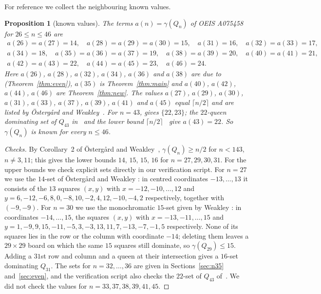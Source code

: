 \documentclass[11pt]{article}
\newtheorem{proposition}[theorem]{Proposition}
\theoremstyle{definition}
\theoremstyle{remark}
\begin{document}
For reference we collect the neighbouring known values.

\begin{proposition}[known values]\label{cor:oeis}
The terms $a(n)=\gamma(Q_n)$ of OEIS A075458 for $26\le n\le46$ are
\begin{gather*}
  a(26)=a(27)=14,\quad a(28)=a(29)=a(30)=15,\quad a(31)=16,\quad a(32)=a(33)=17,\\
  a(34)=18,\quad a(35)=a(36)=a(37)=19,\quad a(38)=a(39)=20,\quad a(40)=a(41)=21,\\
  a(42)=a(43)=22,\quad a(44)=a(45)=23,\quad a(46)=24 .
\end{gather*}
Here $a(26)$, $a(28)$, $a(32)$, $a(34)$, $a(36)$ and $a(38)$ are due to~\cite{HC} (Theorem~\ref{thm:even}),
$a(35)$ is Theorem~\ref{thm:main} and $a(40)$, $a(42)$, $a(44)$, $a(46)$ are Theorem~\ref{thm:new}.
The values $a(27)$, $a(29)$, $a(30)$, $a(31)$, $a(33)$, $a(37)$, $a(39)$, $a(41)$ and $a(45)$ equal
$\lceil n/2\rceil$ and are listed by \"Osterg\aa rd and Weakley~\cite{OW}. For $n=43$, \cite{OW} gives
$\{22,23\}$; the $22$-queen dominating set of $Q_{43}$ in~\cite{Neuhaus} and the lower bound
$\lceil n/2\rceil$~\cite{OW,FW} give $a(43)=22$. So $\gamma(Q_n)$ is known for every $n\le46$.
\end{proposition}

\begin{proof}[Checks]
By Corollary~2 of \"Osterg\aa rd and Weakley~\cite{OW}, $\gamma(Q_n)\ge n/2$ for $n<143$,
$n\ne3,11$; this gives the lower bounds $14$, $15$, $15$, $16$ for $n=27,29,30,31$. For the upper bounds
we check explicit sets directly in our verification script.
For $n=27$ we use the $14$-set of \"Osterg\aa rd and Weakley \cite[\S5]{OW}: in centred coordinates
$-13,\dots,13$ it consists of the $13$ squares $(x,y)$ with $x=-12,-10,\dots,12$ and
$y=6,-12,-6,8,0,-8,10,-2,4,12,-10,-4,2$ respectively, together with $(-9,-9)$.
For $n=30$ we use the monochromatic $15$-set given by Weakley \cite[proof of Proposition~21]{Weakley2022}: in
coordinates $-14,\dots,15$, the squares $(x,y)$ with $x=-13,-11,\dots,15$ and
$y=1,-9,9,15,-11,-5,3,-3,13,11,7,-13,-7,-1,5$ respectively. None of its squares lies in the row or the
column with coordinate $-14$; deleting them leaves a $29\times29$ board on which the same $15$ squares
still dominate, so $\gamma(Q_{29})\le15$. Adding a $31$st row and column and a queen at their
intersection gives a $16$-set dominating $Q_{31}$. The sets for $n=32,\dots,36$ are given in
Sections~\ref{sec:n35} and~\ref{sec:even}, and the verification script also checks the $22$-set of $Q_{43}$
of~\cite{Neuhaus}. We did not check the values for $n=33,37,38,39,41,45$.
\end{proof}
\end{document}
